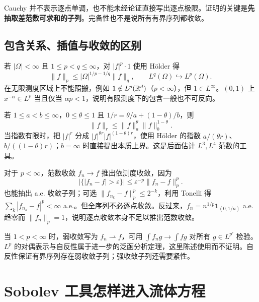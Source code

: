 \begin{warningbox}
Cauchy 并不表示逐点单调，也不能未经论证直接写出逐点极限。证明的关键是\textbf{先抽取差范数可求和的子列}。完备性也不是说所有有界序列都收敛。
\end{warningbox}

\subsection{包含关系、插值与收敛的区别}

若 $|\Omega|<\infty$ 且 $1\le p<q\le\infty$，对 $|f|^p\cdot1$ 使用 H\"older 得
\begin{equation}
 \|f\|_p\le|\Omega|^{1/p-1/q}\|f\|_q,
 \qquad L^q(\Omega)\hookrightarrow L^p(\Omega).
 \label{eq:lp-finite-inclusion}
\end{equation}
在无限测度区域上不能照搬，例如 $1\notin L^p(\mathbb R^d)$（$p<\infty$），但 $1\in L^\infty$。$(0,1)$ 上 $x^{-\alpha}\in L^p$ 当且仅当 $\alpha p<1$，说明有限测度下的包含一般也不可反向。

若 $1\le a<b\le\infty$，$0\le\theta\le1$ 且 $1/r=\theta/a+(1-\theta)/b$，则
\begin{equation}
 \|f\|_r\le\|f\|_a^\theta\|f\|_b^{1-\theta}.
 \label{eq:lp-interpolation}
\end{equation}
当指数有限时，把 $|f|^r$ 分成 $|f|^{\theta r}|f|^{(1-\theta)r}$，使用 H\"older 的指数 $a/(\theta r)$、$b/((1-\theta)r)$；$b=\infty$ 时直接提出本质上界。这是后面估计 $L^3,L^4$ 范数的工具。

对于 $p<\infty$，范数收敛 $f_n\to f$ 推出依测度收敛，因为
\[
 |\{|f_n-f|>\varepsilon\}|\le\varepsilon^{-p}\|f_n-f\|_p^p.
\]
也能抽出 a.e. 收敛子列；可选 $\|f_{n_k}-f\|_p^p\le2^{-k}$，利用 Tonelli 得 $\sum_k|f_{n_k}-f|^p<\infty$ a.e.。但全序列不必逐点收敛。反过来，$f_n=n^{1/p}\mathbf1_{(0,1/n)}$ a.e. 趋零而 $\|f_n\|_p=1$，说明逐点收敛本身不足以推出范数收敛。

当 $1<p<\infty$ 时，弱收敛写为 $f_n\rightharpoonup f$，可用 $\int f_ng\to\int fg$ 对所有 $g\in L^{p'}$ 检验。$L^p$ 的对偶表示与自反性属于进一步的泛函分析定理，这里陈述使用而不证明。自反性保证有界序列存在弱收敛子列；强收敛子列还需要紧性。





\section{Sobolev 工具怎样进入流体方程}\label{sec:sobolev-fluids}

